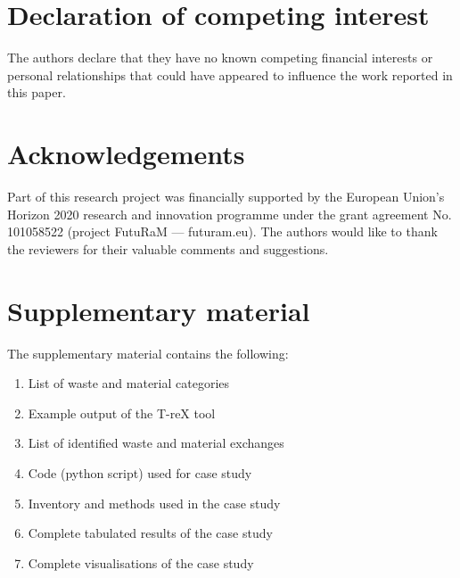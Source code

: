 \documentclass[final,5p,authoryear]{elsarticle}
\begin{document}
\section*{Declaration of competing interest}
The authors declare that they have no known competing financial interests or personal relationships that could have appeared to influence the work reported in this paper.

\section*{Acknowledgements}
    Part of this research project was financially supported by the European Union's Horizon 2020 research and innovation programme under the grant agreement No. 101058522 (project FutuRaM --- futuram.eu). The authors would like to thank the reviewers for their valuable comments and suggestions.

\section*{Supplementary material}
    The supplementary material contains the following:
    \begin{enumerate}
        \item List of waste and material categories
        \item Example output of the T-reX tool
        \item List of identified waste and material exchanges
        \item Code (python script) used for case study
        \item Inventory and methods used in the case study
        \item Complete tabulated results of the case study
        \item Complete visualisations of the case study
    \end{enumerate}



    


\end{document}
